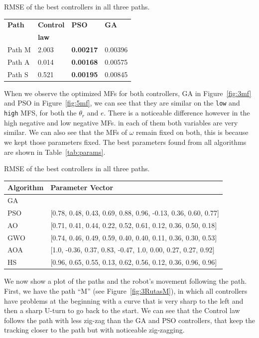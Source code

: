 \documentclass[symmetry,article,submit,moreauthors,pdftex]{Definitions/mdpi}
\begin{document}
\begin{specialtable}[H] 
\small
\caption{RMSE of the best controllers in all three paths.}\label{tab:rmse}
\begin{tabular}{llll}
\toprule
\textbf{Path}	& \textbf{Control } &\textbf{PSO}	& \textbf{GA}\\
	& \textbf{law} & & \\
\midrule
Path M & 2.003 & \textbf{0.00217} & 0.00396 \\
Path A & 0.014 & \textbf{0.00168} & 0.00575 \\
Path S & 0.521 & \textbf{0.00195} & 0.00845 \\
\bottomrule
\end{tabular}
\end{specialtable}

When we observe the optimized MFs for both controllers, GA in
Figure~\ref{fig:3mf} and PSO in Figure~\ref{fig:5mf}, we can see that they are
similar on the \texttt{low} and \texttt{high} MFS, for both the $\theta_r$ and
$e$. There is a noticeable difference however in the high negative and low
negative MFs. in each of them both variables are very similar.  We can also see
that the MFs of $\omega$ remain fixed on both, this is because we kept those
parameters fixed. The best parameters found from all algorithms are shown in
Table~\ref{tab:params}.

\begin{specialtable}[H] 
\small
\caption{RMSE of the best controllers in all three paths.}\label{tab:params}
\begin{tabular}{ll}
\toprule
\textbf{Algorithm}	& \textbf{Parameter Vector}\\ 
\midrule
GA & \\
PSO & [0.78, 0.48, 0.43, 0.69, 0.88, 0.96, -0.13, 0.36, 0.60, 0.77]\\
AO & [0.71, 0.41, 0.44, 0.22, 0.52, 0.61, 0.12, 0.36, 0.50, 0.18]\\
GWO & [0.74, 0.46, 0.49, 0.59, 0.40, 0.40, 0.11, 0.36, 0.30, 0.53]\\
AOA & [1.0, -0.36, 0.37, 0.83, -0.47, 1.0, 0.00, 0.27, 0.27, 0.92]\\
HS & [0.96, 0.65, 0.55, 0.13, 0.62, 0.56, 0.12, 0.36, 0.96, 0.96]\\
\bottomrule
\end{tabular}
\end{specialtable}

We now show a plot of the paths and the robot's movement following the path.
First, we have the path ``M'' (see Figure~\ref{fig:3RutasM}), in which all
controllers have problems at the beginning with a curve that is very sharp to
the left and then a sharp U-turn to go back to the start.  We can see that the
Control law follows the path with less zig-zag than the GA and PSO controllers, that
keep the tracking closer to the path but with noticeable zig-zagging.
\end{document}
